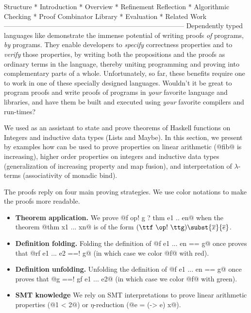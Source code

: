 

Structure
* Introduction
* Overview
* Refinement Reflection
* Algorithmic Checking
* Proof Combinator Library
* Evaluation
* Related Work
--------------------------------------------------------------------------------
Dependently typed languages like demonstrate the
immense potential of writing proofs \emph{of}
programs, \emph{by} programs.
%
They enable developers to \emph{specify} correctness
properties and to \emph{verify} those properties, by
writing both the propositions and the proofs as
ordinary terms in the language, thereby uniting
programming and proving into complementary parts
of a whole.
%
Unfortunately, so far, these benefits require one
to work in one of these specially designed languages.
%
Wouldn't it be great to program proofs and write
proofs of programs in \emph{your} favorite language
and libraries, and have them be built and executed
using \emph{your} favorite compilers and run-times?



We used \libname as an assistant
to state and prove theorems
of Haskell functions
on Integers and inductive data types (Lists and Maybe).
%
In this section, we present by examples how \libname
can be used to prove properties on linear arithmetic
(\eg @fib@ is increasing), higher order properties on
integers and inductive data types (\eg generalization
of increasing property and map fusion), and interpretation
of $\lambda$-terms (\eg associativity of monadic bind).

%
The proofs reply on four main proving strategies.
We use color notations to make the proofs more readable.
%
\begin{itemize}
\item\textbf{Theorem application.}
We prove
@f op! g ?  thm e1 .. en@
when the theorem @thm x1 ... xn@
is of the form $(\ttf\ \op ! \ \ttg) \subst{\overline{x}}{\overline{e}}$.
\item \textbf{Definition folding.}
Folding the definition of @f e1 ... en == g@ once
proves that
@rf e1 ... e2 ==! g@
(in which case we color @f@ with red).
%
\item \textbf{Definition unfolding.}
Unfolding the definition of @f e1 ... en == g@ once
proves that
@g ==! gf e1 ... e2@
(in which case we color @f@ with green).
\item \textbf{SMT knowledge}
We rely on SMT interpretations to prove
linear arithmetic properties (\eg @1 < 2@)
or $\eta$-reduction (\eg @e = (\x -> e) x@).
\end{itemize}

